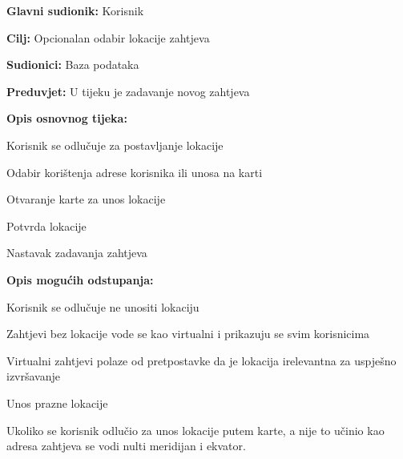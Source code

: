 					\noindent {}
					\begin{packed_item}
						
						\item \textbf{Glavni sudionik: }Korisnik
						\item  \textbf{Cilj:} Opcionalan odabir lokacije zahtjeva
						\item  \textbf{Sudionici:} Baza podataka
						\item  \textbf{Preduvjet:} U tijeku je zadavanje novog zahtjeva
						\item  \textbf{Opis osnovnog tijeka:}
						
						\item[] \begin{packed_enum}
							
							\item Korisnik se odlučuje za postavljanje lokacije
							\item Odabir korištenja adrese korisnika ili unosa na karti
							\item Otvaranje karte za unos lokacije
							\item Potvrda lokacije
							\item Nastavak zadavanja zahtjeva
						\end{packed_enum}
						
						\item  \textbf{Opis mogućih odstupanja:}
						
						\item[] \begin{packed_item}
							
							
							\item[1.a] Korisnik se odlučuje ne unositi lokaciju
							\item[] \begin{packed_enum}
								
								\item Zahtjevi bez lokacije vode se kao virtualni i prikazuju se svim korisnicima
								\item Virtualni zahtjevi polaze od pretpostavke da je lokacija irelevantna za uspješno izvršavanje
							
								\end{packed_enum}	
							\item[3.a] Unos prazne lokacije
							\item[] \begin{packed_enum}
								\item Ukoliko se korisnik odlučio za unos lokacije putem karte, a nije to učinio kao adresa zahtjeva se vodi nulti meridijan i ekvator.
							\end{packed_enum} 						
						\end{packed_item}
					\end{packed_item}
				
